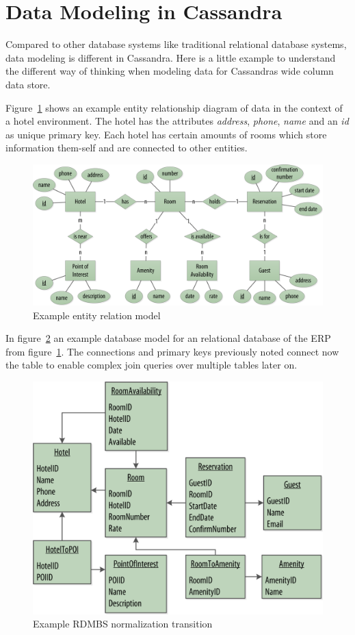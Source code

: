 \section{Data Modeling in Cassandra}  %

Compared to other database systems like traditional relational database systems, data modeling is different in Cassandra. Here is a little example to understand the different way of thinking when modeling data for Cassandras wide column data store.

Figure~\ref{fig:cassandra:model_data0} shows an example entity relationship diagram of data in the context of a hotel environment. The hotel has the attributes \textit{address}, \textit{phone}, \textit{name} and an \textit{id} as unique primary key. Each hotel has certain amounts of rooms which store information them-self and are connected to other entities.

\begin{figure}[H]
    \centering
    \includegraphics[width=0.75\columnwidth]{img/model_example_entity_relation_step0.png}
    \caption{Example entity relation model \autocite{cassandra_oreilly}}
    \label{fig:cassandra:model_data0}
\end{figure}

In figure~\ref{fig:cassandra:model_data1} an example database model for an relational database of the ERP from figure~\ref{fig:cassandra:model_data0}.
The connections and primary keys previously noted connect now the table to enable complex join queries over multiple tables later on.

\begin{figure}[H]
    \centering
    \includegraphics[width=0.75\columnwidth]{img/model_example_rdbms_step1.png}
    \caption{Example RDMBS normalization transition \autocite{cassandra_oreilly}}
    \label{fig:cassandra:model_data1}
\end{figure}

